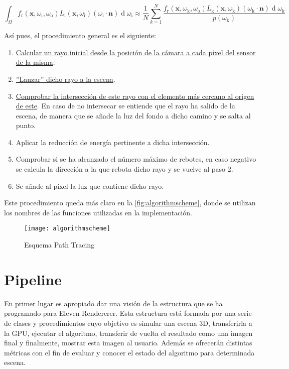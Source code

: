 \[
{\int _{\Omega }f_{\text{r}}(\mathbf {x} ,\omega _{\text{i}},\omega _{\text{o}})L_{\text{i}}(\mathbf {x} ,\omega _{\text{i}})(\omega _{\text{i}}\cdot \mathbf {n} )\operatorname {d} \omega _{\text{i}} \approx \displaystyle \frac{1}{N}\sum\limits_{k=1}^{N}\frac{f_{\text{r}}(\mathbf {x} ,\omega _{\text{k}},\omega _{\text{o}})L_{\text{k}}(\mathbf {x} ,\omega _{\text{k}})(\omega _{\text{k}}\cdot \mathbf {n} )\operatorname {d} \omega _{\text{k}}}{p(\omega _{\text{k}})}}
\]

Así pues, el procedimiento general es el siguiente:

\begin{enumerate}
	\item \hyperref[sec:calculatecameraray]{Calcular un rayo inicial desde la posición de la cámara a cada píxel del sensor de la misma}.
	\item \hyperref[sec:throwray]{''Lanzar'' dicho rayo a la escena}.
	\item \hyperref[subsec:triintersection]{Comprobar la intersección de este rayo con el elemento más cercano al origen de este}. En caso de no intersecar se entiende que el rayo ha salido de la escena, de manera que se añade la luz del fondo a dicho camino y se salta al punto.
	\item Aplicar la reducción de energía pertinente a dicha intersección.
	\item Comprobar si se ha alcanzado el número máximo de rebotes, en caso negativo se calcula la dirección a la que rebota dicho rayo y se vuelve al paso 2.
	\item Se añade al píxel la luz que contiene dicho rayo.
\end{enumerate}

Este procedimiento queda más claro en la \autoref{fig:algorithmscheme}, donde se utilizan los nombres de las funciones utilizadas en la implementación.

\begin{figure}[H]
    \centering
	\texttt{[image: algorithmscheme]}
	\caption{Esquema Path Tracing}
	\label{fig:algorithmscheme}
\end{figure}



	\section{Pipeline}
		
En primer lugar es apropiado dar una visión de la estructura que se ha programado para Eleven Rendererer. Esta estructura está formada por una serie de clases y procedimientos cuyo objetivo es simular una escena 3D, transferirla a la GPU, ejecutar el algoritmo, transferir de vuelta el resultado como una imagen final y finalmente, mostrar esta imagen al usuario. Además se ofrecerán distintas métricas con el fin de evaluar y conocer el estado del algoritmo para determinada escena.

